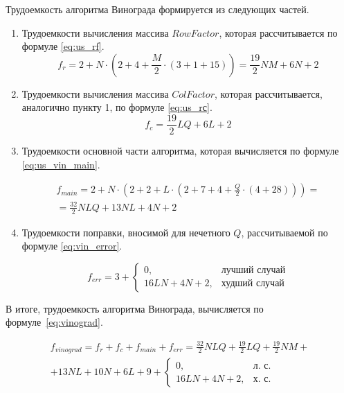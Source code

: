 Трудоемкость алгоритма Винограда формируется из следующих частей.
\begin{enumerate}
	\item Трудоемкости вычисления массива $RowFactor$, которая рассчитывается по формуле \eqref{eq:us_rf}.
	\begin{equation}
		\label{eq:us_rf}
		f_{r} = 2 + N \cdot (2 + 4 + \frac{M}{2} \cdot (3 + 1 + 15)) = \frac{19}{2}NM + 6N + 2
	\end{equation}
	
	\item Трудоемкости вычисления массива $ColFactor$, которая рассчитывается, аналогично пункту 1, по формуле \eqref{eq:us_rс}.
	\begin{equation}
		\label{eq:us_rс}
		f_{c} = \frac{19}{2}LQ + 6L + 2
	\end{equation}
	
	\item Трудоемкости основной части алгоритма, которая вычисляется по формуле \eqref{eq:us_vin_main}.
	
	\begin{equation}
		\label{eq:us_vin_main}
		\begin{gathered}
		f_{main} = 2 + N \cdot (2 + 2 + L \cdot (2 + 7 + 4 + \frac{Q}{2} \cdot (4 + 28))) = \\
		= \frac{32}{2} NLQ + 13NL + 4N + 2
		\end{gathered}
	\end{equation}
	
	\item Трудоемкости поправки, вносимой для нечетного $Q$, рассчитываемой по формуле \eqref{eq:vin_error}.
	
	\begin{equation}
		\label{eq:vin_error}
		f_{err} = 3 +
		\begin{cases}
			0, & \text{лучший случай}\\
			16LN + 4N + 2, & \text{худший случай}
		\end{cases}
	\end{equation}
	
\end{enumerate}

\clearpage

В итоге, трудоемкость алгоритма Винограда, вычисляется по формуле~\eqref{eq:vinograd}.

\begin{equation}
	\label{eq:vinograd}
	\begin{gathered}
		f_{vinograd} = f_{r} + f_{c} + f_{main} + f_{err} = \frac{32}{2}NLQ + \frac{19}{2}LQ + \frac{19}{2} NM + \\
		+ 13NL + 10N + 6L + 9 + 
		\begin{cases}
			0, & \text{л.~с.}\\
			16LN + 4N + 2, & \text{х.~с.}
		\end{cases}
	\end{gathered}
\end{equation}


